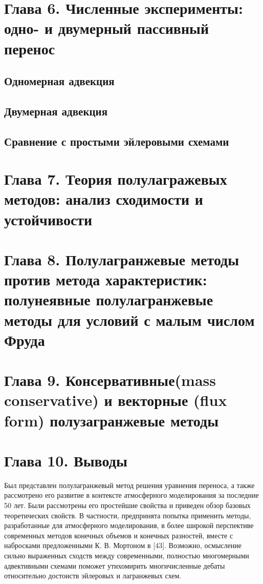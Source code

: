 \chapter*{Глава 6. Численные эксперименты: одно- и двумерный пассивный перенос} \label{chapt_6}
\section*{Одномерная адвекция} \label{sect6_1}
\section*{Двумерная адвекция} \label{sect6_2}
\section*{Сравнение с простыми эйлеровыми схемами} \label{sect6_3}
\chapter*{Глава 7. Теория полулагражевых методов: анализ сходимости и устойчивости} \label{chapt_7}
\chapter*{Глава 8. Полулагранжевые методы против метода характеристик: полунеявные полулагранжевые методы
	 для условий с малым числом Фруда} \label{chapt_8}
\chapter*{Глава 9. Консервативные(mass conservative) и векторные (flux form) полузагранжевые методы} \label{chapt_9}
\newpage
\chapter*{Глава 10. Выводы} \label{chapt_10}
Был представлен полулагранжевый метод решения уравнения переноса, а также рассмотрено его развитие в контексте атмосферного моделирования за последние 50 лет. Были рассмотрены его простейшие свойства и приведен обзор базовых теоретических свойств. В частности, предпринята попытка применить методы, разработанные для атмосферного моделирования, в более широкой перспективе современных методов конечных объемов и конечных разностей, вместе с набросками предложенными К. В. Мортоном в [43]. Возможно, осмысление сильно выраженных сходств между современными, полностью многомерными адвективными схемами поможет утихомирить многичисленные дебаты относительно достоиств эйлеровых и лагранжевых схем.
